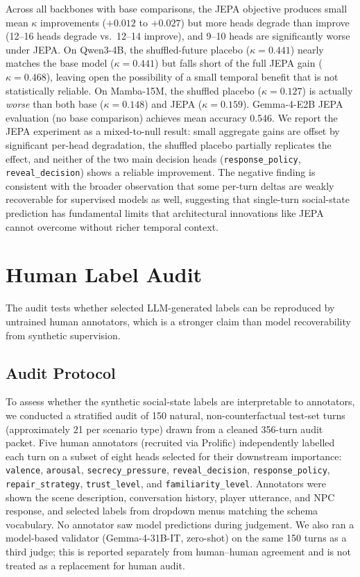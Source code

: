 \documentclass[11pt]{article}
\begin{document}
Across all backbones with base comparisons, the JEPA objective produces small mean $\kappa$ improvements ($+0.012$ to $+0.027$) but more heads degrade than improve (12--16 heads degrade vs.\ 12--14 improve), and 9--10 heads are significantly worse under JEPA.
On Qwen3-4B, the shuffled-future placebo ($\kappa{=}0.441$) nearly matches the base model ($\kappa{=}0.441$) but falls short of the full JEPA gain ($\kappa{=}0.468$), leaving open the possibility of a small temporal benefit that is not statistically reliable.
On Mamba-15M, the shuffled placebo ($\kappa{=}0.127$) is actually \textit{worse} than both base ($\kappa{=}0.148$) and JEPA ($\kappa{=}0.159$).
Gemma-4-E2B JEPA evaluation (no base comparison) achieves mean accuracy 0.546.
We report the JEPA experiment as a mixed-to-null result: small aggregate gains are offset by significant per-head degradation, the shuffled placebo partially replicates the effect, and neither of the two main decision heads (\texttt{response\_policy}, \texttt{reveal\_decision}) shows a reliable improvement.
The negative finding is consistent with the broader observation that some per-turn deltas are weakly recoverable for supervised models as well, suggesting that single-turn social-state prediction has fundamental limits that architectural innovations like JEPA cannot overcome without richer temporal context.

\section{Human Label Audit}
\label{app:human_audit}

The audit tests whether selected LLM-generated labels can be reproduced by untrained human annotators, which is a stronger claim than model recoverability from synthetic supervision.

\subsection{Audit Protocol}

To assess whether the synthetic social-state labels are interpretable to annotators, we conducted a stratified audit of 150 natural, non-counterfactual test-set turns (approximately 21 per scenario type) drawn from a cleaned 356-turn audit packet.
Five human annotators (recruited via Prolific) independently labelled each turn on a subset of eight heads selected for their downstream importance:
\texttt{valence}, \texttt{arousal}, \texttt{secrecy\_pressure}, \texttt{reveal\_decision}, \texttt{response\_policy}, \texttt{repair\_strategy}, \texttt{trust\_level}, and \texttt{familiarity\_level}.
Annotators were shown the scene description, conversation history, player utterance, and NPC response, and selected labels from dropdown menus matching the schema vocabulary.
No annotator saw model predictions during judgement.
We also ran a model-based validator (Gemma-4-31B-IT, zero-shot) on the same 150 turns as a third judge; this is reported separately from human--human agreement and is not treated as a replacement for human audit.
\end{document}
